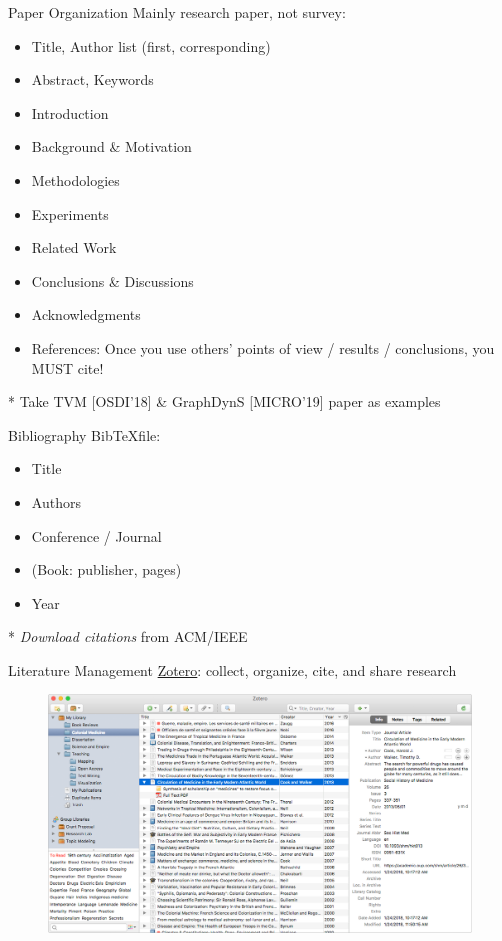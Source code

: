 \documentclass{../TexTemplate/myslide}
\begin{document}
\begin{frame}{Paper Organization}
Mainly research paper, not survey:
\begin{itemize}
	\item Title, Author list (first, corresponding)
	\item Abstract, Keywords
	\item Introduction
	\item Background \& Motivation
	\item Methodologies
	\item Experiments
	\item Related Work
	\item Conclusions \& Discussions
	\item Acknowledgments
	\item References: Once you use others' points of view / results / conclusions, you MUST cite!
\end{itemize}
* Take TVM [OSDI'18] \& GraphDynS [MICRO'19] paper as examples
\end{frame}

\begin{frame}{Bibliography}
Bib\TeX file:
\begin{itemize}
	\item Title
	\item Authors
	\item Conference / Journal
	\item (Book: publisher, pages)
	\item Year
\end{itemize}
* \emph{Download citations} from ACM/IEEE
\end{frame}

\begin{frame}{Literature Management}
\href{https://www.zotero.org}{Zotero}: collect, organize, cite, and share research
\begin{figure}
\centering
\includegraphics[width=0.8\linewidth]{fig/zotero.png}
\end{figure}
\end{frame}
\end{document}
